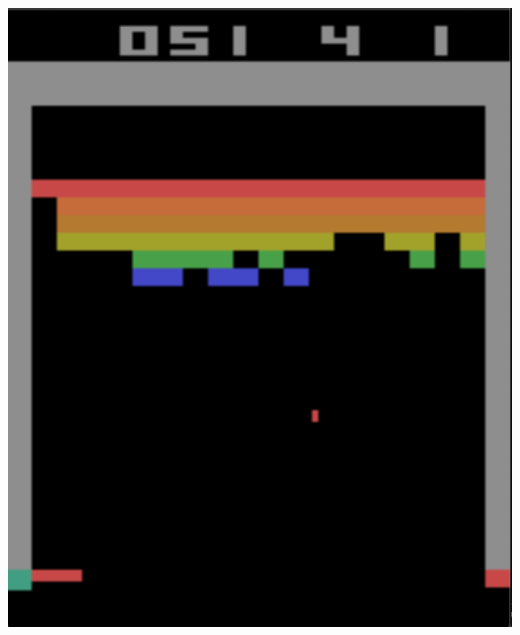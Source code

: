 \documentclass{beamer}
\begin{document}
\begin{frame}
\begin{columns}
    \begin{column}{0.5\textwidth}
      \centering
      \includegraphics[scale=0.3]{../images/breakout.png}
    \end{column}
  
  \end{columns}

  
\end{frame}
\end{document}
